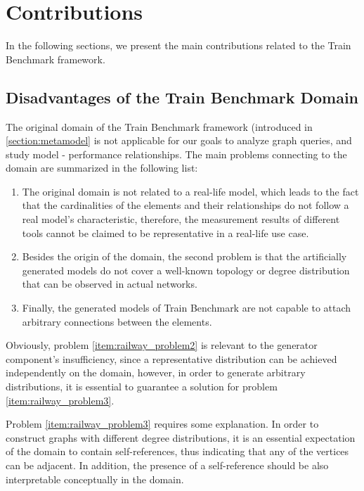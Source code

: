 \chapter{Contributions}

In the following sections, we present the main contributions related to the Train Benchmark framework.

\section{Disadvantages of the Train Benchmark Domain}

The original domain of the Train Benchmark framework (introduced in \ref{section:metamodel} is not applicable for our goals to analyze graph queries, and study model - performance relationships. The main problems connecting to the domain are summarized in the following list:
\begin{enumerate}
	\item The original domain is not related to a real-life model, which leads to the fact that the cardinalities of the elements and their relationships do not follow a real model's characteristic, therefore, the measurement results of different tools cannot be claimed to be representative in a real-life use case. \label{item:railway_problem1}
	\item Besides the origin of the domain, the second problem is that the artificially generated models do not cover a well-known topology or degree distribution that can be observed in actual networks. \label{item:railway_problem2}
	\item Finally, the generated models of Train Benchmark are not capable to attach arbitrary connections between the elements. \label{item:railway_problem3}
\end{enumerate}

Obviously, problem \ref{item:railway_problem2} is relevant to the generator component's insufficiency, since a representative distribution can be achieved independently on the domain, however, in order to generate arbitrary distributions, it is essential to guarantee a solution for problem \ref{item:railway_problem3}.

Problem \ref{item:railway_problem3} requires some explanation. In order to construct graphs with different degree distributions, it is an essential expectation of the domain to contain self-references, thus indicating that any of the vertices can be adjacent. In addition, the presence of a self-reference should be also interpretable conceptually in the domain. %

